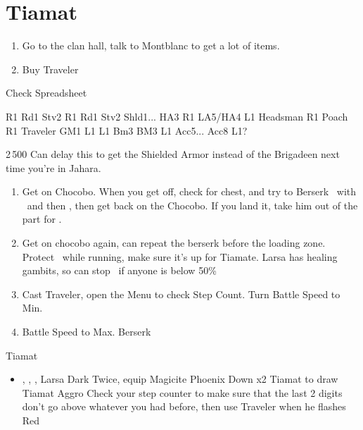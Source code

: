 \chapter{Tiamat}

\begin{enumerate}
	\item Go to the clan hall, talk to Montblanc to get a lot of items.
	\item Buy Traveler
\end{enumerate}
\begin{liscense}
	Check Spreadsheet

	R1	Rd1
	Stv2
	R1	Rd1
	Stv2
	Shld1... HA3					R1
	LA5/HA4
	L1					Headsman
	R1	Poach				R1
	Traveler
	GM1
	L1	L1				Bm3
	BM3	L1
	Acc5... Acc8	L1?
\end{liscense}

\begin{shop}{2\,500}
	Can delay this to get the Shielded Armor instead of the Brigadeen next time you're in Jahara.
\end{shop}
\begin{enumerate}
	\item Get on Chocobo. When you get off, check for chest, and try to Berserk \basch\ with \penelo\ and then \vaan, then get back on the Chocobo. If you land it, take him out of the part for \balthier.
	\item Get on chocobo again, can repeat the berserk before the loading zone.
	      \vaanf Protect \vaan\ while running, make sure it's up for Tiamate. Larsa has healing gambits, so can stop \flee\ if anyone is below 50\%
	\item Cast Traveler, open the Menu to check Step Count. Turn Battle Speed to Min.
	\item Battle Speed to Max. Berserk \basch
\end{enumerate}
\begin{battle}{Tiamat}
	\begin{itemize}
		\item \vaan, \balthier, \basch, Larsa
		      \vaanf Dark Twice, equip Magicite
		      \vaanf Phoenix Down x2 Tiamat to draw Tiamat Aggro
		      \balthierf Check your step counter to make sure that the last 2 digits don't go above whatever you had before, then use Traveler when he flashes Red
	\end{itemize}
\end{battle}
